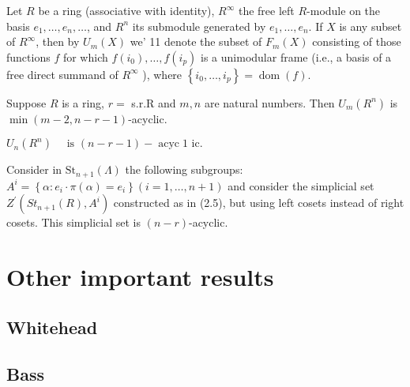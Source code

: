 Let $R$ be a ring (associative with identity), $R^{\infty}$ the free left $R$-module on the basis $e_1, \ldots, e_n, \ldots$, and $R^n$ its submodule generated by $e_1, \ldots, e_n$. If $X$ is any subset of $R^{\infty}$, then by $U_m(X)$ we' 11 denote the subset of $F_m(X)$ consisting of those functions $f$ for which $f\left(i_0\right), \ldots, f\left(i_p\right)$ is a unimodular frame (i.e., a basis of a free direct summand of $R^{\infty}$ ), where $\left\{i_0, \ldots, i_p\right\}=\operatorname{dom}(f)$.

\begin{theo}
Suppose $R$ is a ring, $r=$ s.r.R and $m, n$ are natural numbers. Then $U_m\left(R^n\right)$ is $\min (m-2, n-r-1)$-acyclic.
\end{theo}


\begin{coro}
    $U_n\left(R^n\right) \quad \text { is }(n-r-1)-\operatorname{acyc} 1 \text { ic. }$
\end{coro}

\begin{coro}
Consider in $\mathrm{St}_{n+1}(\Lambda)$ the following subgroups: $A^i=\left\{\alpha: e_i \cdot \pi(\alpha)=e_i\right\}(i=1, \ldots, n+1)$ and consider the simplicial set $Z^{\prime}\left(S t_{n+1}(R), A^i\right)$ constructed as in (2.5), but using left cosets instead of right cosets. This simplicial set is $(n-r)$-acyclic.  
\end{coro}



\chapter{Other important results}

\section{Whitehead}

\section{Bass}






